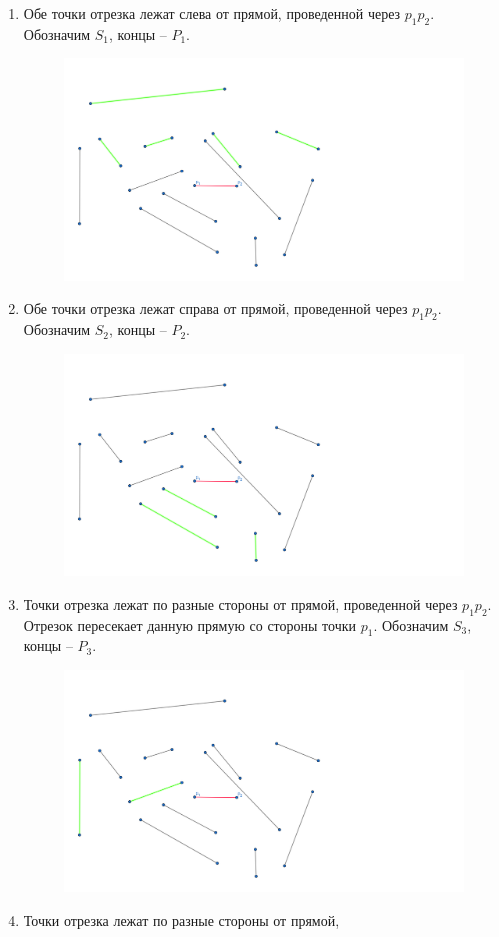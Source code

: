 \documentclass[letterpaper,12pt]{article}
\begin{document}
\begin{enumerate}
      \item Обе точки отрезка лежат слева от прямой, проведенной 
            через $p_1 p_2$. Обозначим $S_1$, концы -- $P_1$.
            \begin{figure}[H]
                  \centering
                  \includegraphics[width=0.5\linewidth]{segment_1.png}
            \end{figure}
      \item Обе точки отрезка лежат справа от прямой, проведенной 
            через $p_1 p_2$. Обозначим $S_2$, концы -- $P_2$.
            \begin{figure}[H]
                  \centering
                  \includegraphics[width=0.5\linewidth]{segment_2.png}
            \end{figure}
            \pagebreak[3]
      \item Точки отрезка лежат по разные стороны от прямой, 
            проведенной через $p_1 p_2$. Отрезок пересекает
            данную прямую со стороны точки $p_1$. 
            Обозначим $S_3$, концы -- $P_3$.
            \begin{figure}[H]
                  \centering
                  \includegraphics[width=0.5\linewidth]{segment_3.png}
            \end{figure}
      \item Точки отрезка лежат по разные стороны от прямой, 

\end{enumerate}
\end{document}
